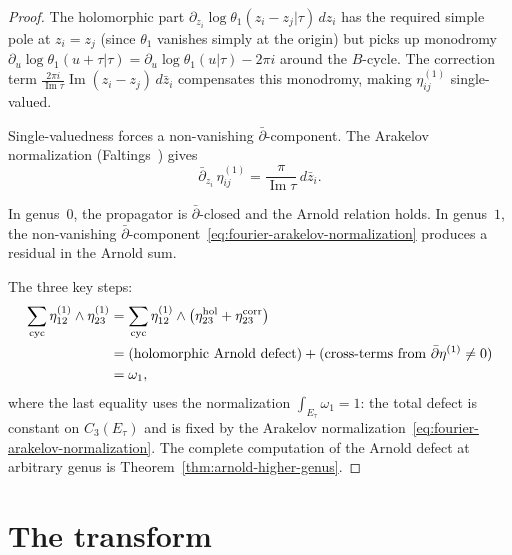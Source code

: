 \begin{proof}
The holomorphic part
$\partial_{z_i}\!\log\theta_1(z_i - z_j|\tau)\,dz_i$ has the
required simple pole at $z_i = z_j$ (since $\theta_1$ vanishes
simply at the origin) but picks up monodromy
$\partial_u\!\log\theta_1(u + \tau|\tau)
 = \partial_u\!\log\theta_1(u|\tau) - 2\pi i$
around the $B$-cycle.  The correction term
$\frac{2\pi i}{\operatorname{Im}\tau}\operatorname{Im}(z_i - z_j)
\,d\bar{z}_i$
compensates this monodromy, making $\eta^{(1)}_{ij}$ single-valued.

Single-valuedness forces a non-vanishing
$\bar{\partial}$-component.  The Arakelov normalization
(Faltings~\cite{Fal84}) gives
\begin{equation}\label{eq:fourier-arakelov-normalization}
\bar{\partial}_{z_i}\, \eta^{(1)}_{ij}
= \frac{\pi}{\operatorname{Im}\tau}\,d\bar{z}_i.
\end{equation}

In genus~$0$, the propagator is $\bar{\partial}$-closed and
the Arnold relation holds.  In genus~$1$, the non-vanishing
$\bar{\partial}$-component~\eqref{eq:fourier-arakelov-normalization}
produces a residual in the Arnold sum.

The three key steps:
\begin{align}
\sum_{\mathrm{cyc}} \eta^{(1)}_{12} \wedge \eta^{(1)}_{23}
&= \sum_{\mathrm{cyc}} \eta^{(1)}_{12} \wedge
  \bigl(\eta^{\mathrm{hol}}_{23}
  + \eta^{\mathrm{corr}}_{23}\bigr)
\notag \\
&= \text{(holomorphic Arnold defect)}
  + \text{(cross-terms from }
  \bar{\partial}\eta^{(1)} \neq 0\text{)}
\notag \\
&= \omega_1,
\label{eq:fourier-arnold-failure-computation}
\end{align}
where the last equality uses the normalization
$\int_{E_\tau}\omega_1 = 1$: the total defect is constant on
$C_3(E_\tau)$ and is fixed by the Arakelov
normalization~\eqref{eq:fourier-arakelov-normalization}.
The complete computation of the Arnold defect at arbitrary genus
is Theorem~\ref{thm:arnold-higher-genus}.
\end{proof}


\section{The transform}\label{sec:fourier-transform}

